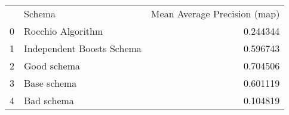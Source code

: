 \begin{tabular}{llr}
 & Schema & Mean Average Precision (map) \\
0 & Rocchio Algorithm & 0.244344 \\
1 & Independent Boosts Schema & 0.596743 \\
2 & Good schema & 0.704506 \\
3 & Base schema & 0.601119 \\
4 & Bad schema & 0.104819 \\
\end{tabular}
